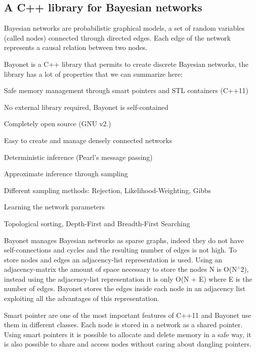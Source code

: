 \subsection*{A C++ library for Bayesian networks }

Bayesian networks are probabilistic graphical models, a set of random variables (called nodes) connected through directed edges. Each edge of the network represents a causal relation between two nodes.

Bayonet is a C++ library that permits to create discrete Bayesian networks, the library has a lot of properties that we can summarize here\-:


\begin{DoxyItemize}
\item Safe memory management through smart pointers and S\-T\-L containers (C++11)
\item No external library required, Bayonet is self-\/contained
\item Completely open source (G\-N\-U v2.)
\item Easy to create and manage densely connected networks
\item Deterministic inference (Pearl's message passing)
\item Approximate inference through sampling
\item Different sampling methods\-: Rejection, Likelihood-\/\-Weighting, Gibbs
\item Learning the network parameters
\item Topological sorting, Depth-\/\-First and Breadth-\/\-First Searching
\end{DoxyItemize}

Bayonet manages Bayesian networks as sparse graphs, indeed they do not have self-\/connections and cycles and the resulting number of edges is not high. To store nodes and edges an adjacency-\/list representation is used. Using an adjacency-\/matrix the amount of space necessary to store the nodes N is O(\-N$^\wedge$2), instead using the adjacency-\/list representation it is only O(N + E) where E is the number of edges. Bayonet stores the edges inside each node in an adjacency list exploiting all the advantages of this representation.

Smart pointer are one of the most important features of C++11 and Bayonet use them in different classes. Each node is stored in a network as a shared pointer. Using smart pointers it is possible to allocate and delete memory in a safe way, it is also possible to share and access nodes without caring about dangling pointers.

